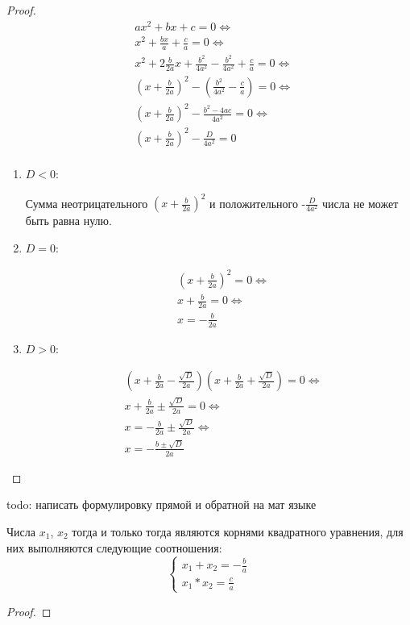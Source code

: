 \begin{proof}
	\begin{align*}
		& ax^2 + bx + c = 0 \iff \\
		& x^2 + \frac{bx}{a} + \frac{c}{a} = 0 \iff \\
		& x^2 + 2 \frac{b}{2a} x + \frac{b^2}{4a^2} - \frac{b^2}{4a^2} + \frac{c}{a} = 0 \iff \\
		& (x + \frac{b}{2a})^2 - (\frac{b^2}{4a^2} - \frac{c}{a}) = 0 \iff \\
		& (x + \frac{b}{2a})^2 - \frac{b^2 - 4ac}{4a^2} = 0 \iff \\
		& (x + \frac{b}{2a})^2 - \frac{D}{4a^2} = 0 \\
	\end{align*}
	
	\begin{enumerate}
		\item $D < 0$:
		
			Сумма неотрицательного $(x + \frac{b}{2a})^2$ и положительного -$\frac{D}{4a^2}$ числа не может быть равна нулю.
			
		\item $D = 0$:
		
			\begin{align*}
				& (x + \frac{b}{2a})^2 = 0 \iff \\
				& x + \frac{b}{2a} = 0 \iff \\
				& x = - \frac{b}{2a}
			\end{align*}
			
		\item $D > 0$:
		
			\begin{align*}
				& (x + \frac{b}{2a} - \frac{\sqrt{D}}{2a})(x + \frac{b}{2a} + \frac{\sqrt{D}}{2a}) = 0 \iff \\
				& x + \frac{b}{2a} \pm \frac{\sqrt{D}}{2a} = 0 \iff \\
				& x = -\frac{b}{2a} \pm \frac{\sqrt{D}}{2a} \iff \\
				& x = - \frac{b \pm \sqrt{D}}{2a}
			\end{align*}
	\end{enumerate}
\end{proof}

\pagebreak

 todo: написать формулировку прямой и обратной на мат языке

\begin{theorem}[Виета]
	Числа $x_1$, $x_2$ тогда и только тогда являются корнями квадратного уравнения, для них выполняются следующие соотношения:
	$$
	\left\{\begin{array}{l}
		x_1 + x_2 = - \frac{b}{a} \\
		x_1 * x_2 = \frac{c}{a}
	\end{array}\right.
	$$
\end{theorem}

\begin{proof}
	
\end{proof}